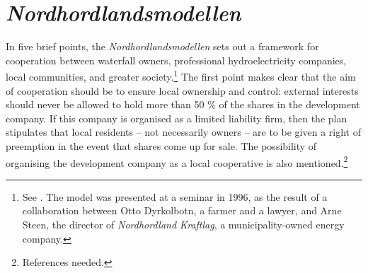 
\section{{\it Nordhordlandsmodellen}}

In five brief points, the {\it Nordhordlandsmodellen} sets out a framework for cooperation between waterfall owners, professional hydroelectricity companies, local communities, and greater society.\footnote{See \cite{dyrkolbotn96}. The model was presented at a seminar in 1996, as the result of a collaboration between Otto Dyrkolbotn, a farmer and a lawyer, and Arne Steen, the director of {\it Nordhordland Kraftlag}, a municipality-owned energy company.} %
The first point makes clear that the aim of cooperation should be to ensure local ownership and control: external interests should never be allowed to hold more than 50 \% of the shares in the development company. If this company is organised as a limited liability firm, then the plan stipulates that local residents -- not necessarily owners -- are to be given a right of preemption in the event that shares come up for sale. The possibility of organising the development company as a local cooperative is also mentioned.\footnote{References needed.}

